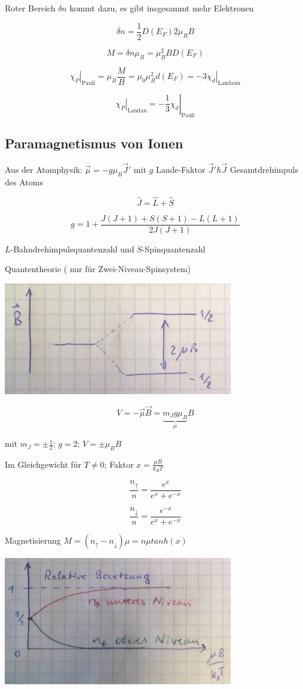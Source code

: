 Roter Bereich \(\delta n\) kommt dazu, es gibt insgesammt mehr Elektronen

\[\delta n = \frac{1}{2}D(E_F) 2\mu_BB\]

\[M = \delta n \mu_B = \mu_B^2 B D(E_F)\]

\[\left.\chi_P\right|_{\text{Pauli}} =\mu_B\frac{M}{B} = \mu_0\mu_B^2 d(E_F) = \left.-3\chi_d\right|_{\text{Landauu}}\]

\[\boxed{ \left.\chi_P\right|_{\text{Landau}} = \left.-\frac{1}{3} \chi_d\right|_{\text{Pauli}} }\]


\subsection{Paramagnetismus von Ionen}

Aus der Atomphysik: \( \vec \mu = -g\mu_B\vec J'\) mit \(g\) Lande-Faktor \(\vec J'\hbar \vec J\) Gesamtdrehimpuls des Atoms

\[\hat J = \hat L + \hat S\]

\[g = 1 + \frac{J(J+1)+S(S+1)-L(L+1)}{2J(J+1)}\]

\(L\)-Bahndrehimpulsquantenzahl und \(S\)-Spinquantenzahl

Quantentheorie ( nur für Zwei-Niveau-Spinsystem)


\includegraphics[width=0.75\textwidth]{kap12_05.png}

\[V = -\vec \mu\vec B = \underbrace{m_J g\mu_B}_{\mu} B\]

mit \(m_J=\pm\frac{1}{2}\); \(g=2\); \(V = \pm\mu_B B\)


Im Gleichgewicht für \(T\neq 0\); Faktor \(x=\frac{\mu B}{k_BT}\)

\[\frac{n_\uparrow}{n} = \frac{e^x}{e^x+e^{-x}}\]

\[\frac{n_\downarrow}{n} = \frac{e^{-x}}{e^x+e^{-x}}\]

Magnetisierung \(M=(n_\uparrow - n_\downarrow)\mu = n\mu tanh(x)\)

\includegraphics[width=0.75\textwidth]{kap12_06.png}

